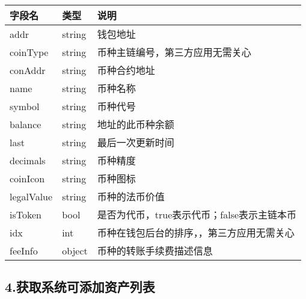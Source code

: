 \documentclass[letterpaper,10pt,english]{sphinxmanual}
\begin{document}
\begin{savenotes}\sphinxattablestart
\centering
\begin{tabulary}{\linewidth}[t]{|T|T|T|}
\hline
\sphinxstyletheadfamily 
字段名
&\sphinxstyletheadfamily 
类型
&\sphinxstyletheadfamily 
说明
\\
\hline
addr
&
string
&
钱包地址
\\
\hline
coinType
&
string
&
币种主链编号，第三方应用无需关心
\\
\hline
conAddr
&
string
&
币种合约地址
\\
\hline
name
&
string
&
币种名称
\\
\hline
symbol
&
string
&
币种代号
\\
\hline
balance
&
string
&
地址的此币种余额
\\
\hline
last
&
string
&
最后一次更新时间
\\
\hline
decimals
&
string
&
币种精度
\\
\hline
coinIcon
&
string
&
币种图标
\\
\hline
legalValue
&
string
&
币种的法币价值
\\
\hline
isToken
&
bool
&
是否为代币，true表示代币；false表示主链本币
\\
\hline
idx
&
int
&
币种在钱包后台的排序，，第三方应用无需关心
\\
\hline
feeInfo
&
object
&
币种的转账手续费描述信息
\\
\hline
\end{tabulary}
\par
\sphinxattableend\end{savenotes}


\begin{sphinxVerbatim}[commandchars=\\\{\}]
     
\end{sphinxVerbatim}


\subsection{4.获取系统可添加资产列表}
\label{\detokenize{BCBWalletSDK_u63a5_u53e3_u8bf4_u660e:id69}}
\end{document}
